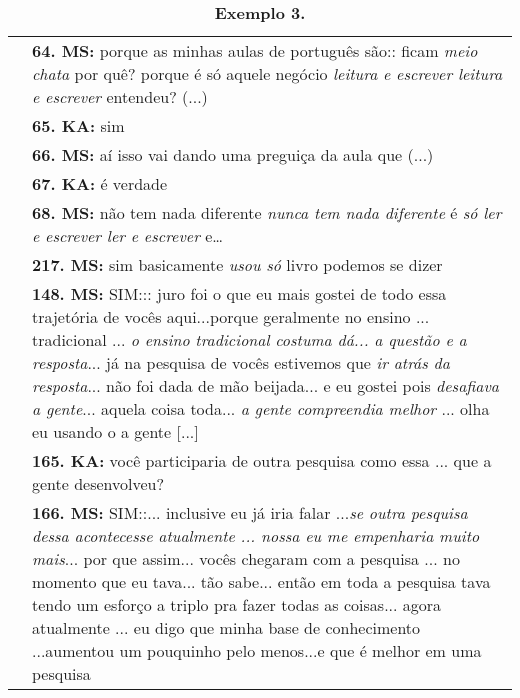 \begin{table}[!t] %
	\centering
	\small
	\begin{threeparttable}
		\caption*{\textbf{Exemplo 3.}}
		\label{tab-04}
		\begin{tabular}{@{} 
				>{\raggedright\arraybackslash}p{} 
				>{\raggedright\arraybackslash}p{} @{}}
			\toprule\noalign{}
			\multicolumn{2}{l}{Milton Santos: compreensão de aula de LP}  \\
			\midrule\noalign{}
			
			\multirow{6}{*}{\textbf{1ª}}   & \textbf{64. MS:} porque as minhas aulas de português são:: ficam \emph{meio chata} por quê? porque é só aquele negócio \emph{leitura e escrever leitura e escrever} entendeu? (...) \\
			
			&\textbf{65. KA: }sim \\
			
			&\textbf{66. MS: }aí isso vai dando uma preguiça da aula que (...) \\
			
			&\textbf{67. KA: }é verdade \\
			
			&\textbf{68. MS: }não tem nada diferente \emph{nunca tem nada diferente} é \emph{só ler e escrever ler e escrever} e\ldots{} \\
			
			&\textbf{217. MS:} sim basicamente \emph{usou só} livro podemos se dizer \\
            \midrule
			
			\multirow{3}{*}{\textbf{2ª }} & \textbf{148. MS:} SIM::: juro foi o que eu mais gostei de todo essa trajetória de vocês aqui...porque geralmente no ensino ... tradicional ... \emph{o ensino tradicional costuma dá... a questão e a resposta}... já na pesquisa de vocês estivemos que \emph{ir atrás da resposta}... não foi dada de mão beijada... e eu gostei pois \emph{desafiava a gente}... aquela coisa toda... \emph{a gente compreendia melhor} ... olha eu usando o a gente {[}...{]} \\
			
			&\textbf{165. KA:} você participaria de outra pesquisa como essa ... que a gente desenvolveu? \\
			
			&\textbf{166. MS:} SIM::... inclusive eu já iria falar ...\emph{se outra pesquisa dessa acontecesse atualmente ... nossa eu me empenharia  muito mais}... por que assim... vocês chegaram com a pesquisa ... no momento que eu tava... tão sabe... então em toda a pesquisa tava tendo um esforço a triplo pra fazer todas as coisas... agora atualmente ... eu digo que minha base de conhecimento ...aumentou um pouquinho pelo menos...e que é melhor em uma pesquisa \\
			
			\bottomrule
		\end{tabular}
	\end{threeparttable}
\centering
\end{table}

